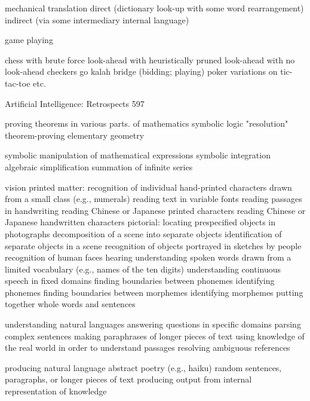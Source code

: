{    mechanical translation
    direct (dictionary look-up with some word rearrangement)
    indirect (via some intermediary internal language)

    game playing

         chess
            with brute force look-ahead
         with heuristically pruned look-ahead
         with no look-ahead checkers
    go
    kalah
    bridge (bidding; playing)
    poker
    variations on tic-tac-toe
    etc.




Artificial Intelligence: Retrospects                                                    597

   proving theorems in various parts. of mathematics
       symbolic logic
              "resolution" theorem-proving
              elementary geometry

   symbolic manipulation of mathematical expressions
      symbolic integration
      algebraic simplification
      summation of infinite series

   vision
        printed matter:
                recognition of individual hand-printed characters drawn
                        from a small class (e.g., numerals)
                reading text in variable fonts reading passages in handwriting
                reading Chinese or Japanese printed characters
                reading Chinese or Japanese handwritten characters
        pictorial:
                locating prespecified objects in photographs
                decomposition of a scene into separate objects
                identification of separate objects in a scene
                recognition of objects portrayed in sketches by people
                recognition of human faces
   hearing
        understanding spoken words drawn from a limited vocabulary (e.g., names of
            the ten digits)
        understanding continuous speech in fixed domains finding boundaries between
            phonemes
        identifying phonemes
        finding boundaries between morphemes
        identifying morphemes
        putting together whole words and sentences

   understanding natural languages
     answering questions in specific domains
      parsing complex sentences
     making paraphrases of longer pieces of text
     using knowledge of the real world in order to understand passages
     resolving ambiguous references

   producing natural language
       abstract poetry (e.g., haiku)
       random sentences, paragraphs, or longer pieces of text producing output from
       internal representation of knowledge




}
